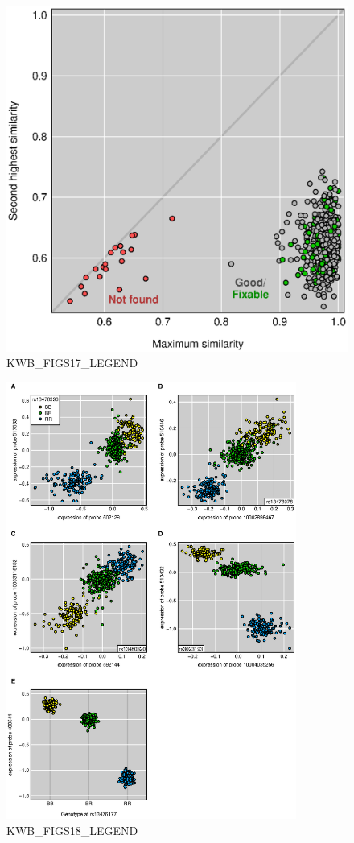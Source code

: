 \documentclass[letterpaper,twoside]{article}
\begin{document}
\begin{figure}[p]
\centerline{\includegraphics[width=4.5in]{SuppFigs/figS17.eps}}

\caption{KWB_FIGS17_LEGEND}
\end{figure}


\clearpage




\begin{figure}[p]
\centerline{\includegraphics[width=0.85\textwidth]{SuppFigs/figS18.eps}}

\caption{KWB_FIGS18_LEGEND}
\end{figure}
\end{document}
